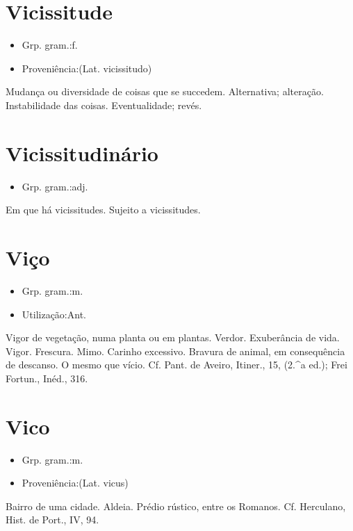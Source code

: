 \documentclass{article}
\begin{document}
\section{Vicissitude}
\begin{itemize}
\item {Grp. gram.:f.}
\end{itemize}
\begin{itemize}
\item {Proveniência:(Lat. \textunderscore vicissitudo\textunderscore )}
\end{itemize}
Mudança ou diversidade de coisas que se succedem.
Alternativa; alteração.
Instabilidade das coisas.
Eventualidade; revés.
\section{Vicissitudinário}
\begin{itemize}
\item {Grp. gram.:adj.}
\end{itemize}
Em que há vicissitudes.
Sujeito a vicissitudes.
\section{Viço}
\begin{itemize}
\item {Grp. gram.:m.}
\end{itemize}
\begin{itemize}
\item {Utilização:Ant.}
\end{itemize}
Vigor de vegetação, numa planta ou em plantas.
Verdor.
Exuberância de vida.
Vigor.
Frescura.
Mimo.
Carinho excessivo.
Bravura de animal, em consequência de descanso.
O mesmo que \textunderscore vício\textunderscore . Cf. Pant. de Aveiro, \textunderscore Itiner.\textunderscore , 15, (2.^a ed.); Frei Fortun., \textunderscore Inéd.\textunderscore , 316.
\section{Vico}
\begin{itemize}
\item {Grp. gram.:m.}
\end{itemize}
\begin{itemize}
\item {Proveniência:(Lat. \textunderscore vicus\textunderscore )}
\end{itemize}
Bairro de uma cidade.
Aldeia.
Prédio rústico, entre os Romanos. Cf. Herculano, \textunderscore Hist. de Port.\textunderscore , IV, 94.
\end{document}
